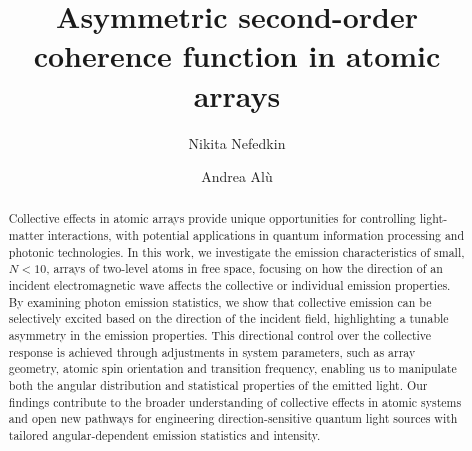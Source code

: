 \documentclass[aps,prl,twocolumn,superscriptaddress,showpacs,amsmath,amssymb]{revtex4-2}
\begin{document}
\title{Asymmetric second-order coherence function in atomic arrays}

\author{Nikita Nefedkin}

\author{Andrea Alù}


\begin{abstract}
    Collective effects in atomic arrays provide unique opportunities for controlling light-matter interactions, with potential applications in quantum information processing and photonic technologies. 
    In this work, we investigate the emission characteristics of small, $N < 10$, arrays of two-level atoms in free space, focusing on how the direction of an incident electromagnetic wave affects the collective or individual emission properties. 
    By examining photon emission statistics, we show that collective emission can be selectively excited based on the direction of the incident field, highlighting a tunable asymmetry in the emission properties. 
    This directional control over the collective response is achieved through adjustments in system parameters, such as array geometry, atomic spin orientation and transition frequency, enabling us to manipulate both the angular distribution and statistical properties of the emitted light. 
    Our findings contribute to the broader understanding of collective effects in atomic systems and open new pathways for engineering direction-sensitive quantum light sources with tailored angular-dependent emission statistics and intensity.
\end{abstract}
\end{document}
